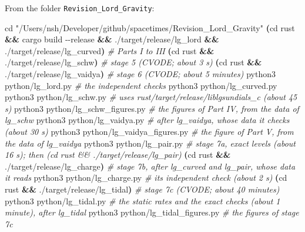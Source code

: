 \documentclass[
  10pt,
]{article}
\newenvironment{Shaded}{}{}
\newcommand{\AttributeTok}[1]{\textcolor[rgb]{0.49,0.56,0.16}{#1}}
\newcommand{\BuiltInTok}[1]{\textcolor[rgb]{0.00,0.50,0.00}{#1}}
\newcommand{\CommentTok}[1]{\textcolor[rgb]{0.38,0.63,0.69}{\textit{#1}}}
\newcommand{\ExtensionTok}[1]{#1}
\newcommand{\KeywordTok}[1]{\textcolor[rgb]{0.00,0.44,0.13}{\textbf{#1}}}
\newcommand{\NormalTok}[1]{#1}
\newcommand{\StringTok}[1]{\textcolor[rgb]{0.25,0.44,0.63}{#1}}
\begin{document}
From the folder \texttt{Revision\_Lord\_Gravity}:

\begin{Shaded}
\begin{Highlighting}[]
\BuiltInTok{cd} \StringTok{"/Users/nsh/Developer/github/spacetimes/Revision\_Lord\_Gravity"}
\KeywordTok{(}\BuiltInTok{cd}\NormalTok{ rust }\KeywordTok{\&\&} \ExtensionTok{cargo}\NormalTok{ build }\AttributeTok{{-}{-}release} \KeywordTok{\&\&} \ExtensionTok{./target/release/lg\_lord} \KeywordTok{\&\&} \ExtensionTok{./target/release/lg\_curved}\KeywordTok{)}   \CommentTok{\# Parts I to III}
\KeywordTok{(}\BuiltInTok{cd}\NormalTok{ rust }\KeywordTok{\&\&} \ExtensionTok{./target/release/lg\_schw}\KeywordTok{)}          \CommentTok{\# stage 5 (CVODE; about 3 s)}
\KeywordTok{(}\BuiltInTok{cd}\NormalTok{ rust }\KeywordTok{\&\&} \ExtensionTok{./target/release/lg\_vaidya}\KeywordTok{)}        \CommentTok{\# stage 6 (CVODE; about 5 minutes)}
\ExtensionTok{python3}\NormalTok{ python/lg\_lord.py                      }\CommentTok{\# the independent checks}
\ExtensionTok{python3}\NormalTok{ python/lg\_curved.py}
\ExtensionTok{python3}\NormalTok{ python/lg\_schw.py                      }\CommentTok{\# uses rust/target/release/liblgsundials\_c (about 45 s)}
\ExtensionTok{python3}\NormalTok{ python/lg\_schw\_figures.py              }\CommentTok{\# the figures of Part IV, from the data of lg\_schw}
\ExtensionTok{python3}\NormalTok{ python/lg\_vaidya.py                    }\CommentTok{\# after lg\_vaidya, whose data it checks (about 30 s)}
\ExtensionTok{python3}\NormalTok{ python/lg\_vaidya\_figures.py            }\CommentTok{\# the figure of Part V, from the data of lg\_vaidya}
\ExtensionTok{python3}\NormalTok{ python/lg\_pair.py                      }\CommentTok{\# stage 7a, exact levels (about 16 s); then (cd rust \&\& ./target/release/lg\_pair)}
\KeywordTok{(}\BuiltInTok{cd}\NormalTok{ rust }\KeywordTok{\&\&} \ExtensionTok{./target/release/lg\_charge}\KeywordTok{)}        \CommentTok{\# stage 7b, after lg\_curved and lg\_pair, whose data it reads}
\ExtensionTok{python3}\NormalTok{ python/lg\_charge.py                    }\CommentTok{\# its independent check (about 2 s)}
\KeywordTok{(}\BuiltInTok{cd}\NormalTok{ rust }\KeywordTok{\&\&} \ExtensionTok{./target/release/lg\_tidal}\KeywordTok{)}         \CommentTok{\# stage 7c (CVODE; about 40 minutes)}
\ExtensionTok{python3}\NormalTok{ python/lg\_tidal.py                     }\CommentTok{\# the static rates and the exact checks (about 1 minute), after lg\_tidal}
\ExtensionTok{python3}\NormalTok{ python/lg\_tidal\_figures.py             }\CommentTok{\# the figures of stage 7c}

\end{Highlighting}
\end{Shaded}
\end{document}
